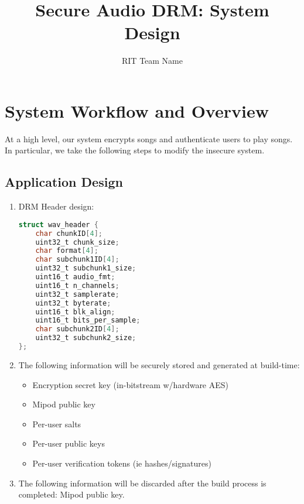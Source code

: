 \documentclass[11pt]{extarticle}
\title{Secure Audio DRM: System Design}
\author{RIT Team Name}
\date{}
\begin{document}
\maketitle

\section{System Workflow and Overview}
At a high level, our system encrypts songs and authenticate users to play songs. 
In particular, we take the following steps to modify the insecure system.

\subsection{Application Design}

\begin{enumerate}
    \item DRM Header design: 
    \begin{lstlisting}[language=C, label={lst:cache}]
struct wav_header {
    char chunkID[4]; 
    uint32_t chunk_size; 
    char format[4]; 
    char subchunk1ID[4]; 
    uint32_t subchunk1_size; 
    uint16_t audio_fmt; 
    uint16_t n_channels; 
    uint32_t samplerate; 
    uint32_t byterate; 
    uint16_t blk_align; 
    uint16_t bits_per_sample; 
    char subchunk2ID[4]; 
    uint32_t subchunk2_size; 
};
    \end{lstlisting}

    \item The following information will be securely stored and generated at build-time:
    \begin{itemize}
        \item Encryption secret key (in-bitstream w/hardware AES)
        \item Mipod public key
        \item Per-user salts
        \item Per-user public keys
        \item Per-user verification tokens (ie hashes/signatures)
    \end{itemize}
    
    \item The following information will be discarded after the build process is completed: Mipod public key.
    

\end{enumerate}
\end{document}
